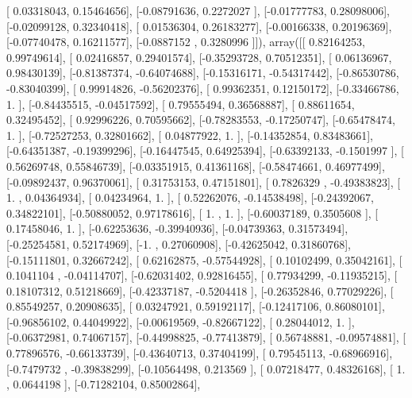 \documentclass{article}
\begin{document}
       [ 0.03318043,  0.15464656],
       [-0.08791636,  0.2272027 ],
       [-0.01777783,  0.28098006],
       [-0.02099128,  0.32340418],
       [ 0.01536304,  0.26183277],
       [-0.00166338,  0.20196369],
       [-0.07740478,  0.16211577],
       [-0.0887152 ,  0.3280996 ]]), array([[ 0.82164253,  0.99749614],
       [ 0.02416857,  0.29401574],
       [-0.35293728,  0.70512351],
       [ 0.06136967,  0.98430139],
       [-0.81387374, -0.64074688],
       [-0.15316171, -0.54317442],
       [-0.86530786, -0.83040399],
       [ 0.99914826, -0.56202376],
       [ 0.99362351,  0.12150172],
       [-0.33466786,  1.        ],
       [-0.84435515, -0.04517592],
       [ 0.79555494,  0.36568887],
       [ 0.88611654,  0.32495452],
       [ 0.92996226,  0.70595662],
       [-0.78283553, -0.17250747],
       [-0.65478474,  1.        ],
       [-0.72527253,  0.32801662],
       [ 0.04877922,  1.        ],
       [-0.14352854,  0.83483661],
       [-0.64351387, -0.19399296],
       [-0.16447545,  0.64925394],
       [-0.63392133, -0.1501997 ],
       [ 0.56269748,  0.55846739],
       [-0.03351915,  0.41361168],
       [-0.58474661,  0.46977499],
       [-0.09892437,  0.96370061],
       [ 0.31753153,  0.47151801],
       [ 0.7826329 , -0.49383823],
       [ 1.        ,  0.04364934],
       [ 0.04234964,  1.        ],
       [ 0.52262076, -0.14538498],
       [-0.24392067,  0.34822101],
       [-0.50880052,  0.97178616],
       [ 1.        ,  1.        ],
       [-0.60037189,  0.3505608 ],
       [ 0.17458046,  1.        ],
       [-0.62253636, -0.39940936],
       [-0.04739363,  0.31573494],
       [-0.25254581,  0.52174969],
       [-1.        ,  0.27060908],
       [-0.42625042,  0.31860768],
       [-0.15111801,  0.32667242],
       [ 0.62162875, -0.57544928],
       [ 0.10102499,  0.35042161],
       [ 0.1041104 , -0.04114707],
       [-0.62031402,  0.92816455],
       [ 0.77934299, -0.11935215],
       [ 0.18107312,  0.51218669],
       [-0.42337187, -0.5204418 ],
       [-0.26352846,  0.77029226],
       [ 0.85549257,  0.20908635],
       [ 0.03247921,  0.59192117],
       [-0.12417106,  0.86080101],
       [-0.96856102,  0.44049922],
       [-0.00619569, -0.82667122],
       [ 0.28044012,  1.        ],
       [-0.06372981,  0.74067157],
       [-0.44998825, -0.77413879],
       [ 0.56748881, -0.09574881],
       [ 0.77896576, -0.66133739],
       [-0.43640713,  0.37404199],
       [ 0.79545113, -0.68966916],
       [-0.7479732 , -0.39838299],
       [-0.10564498,  0.213569  ],
       [ 0.07218477,  0.48326168],
       [ 1.        ,  0.0644198 ],
       [-0.71282104,  0.85002864],
\end{document}

